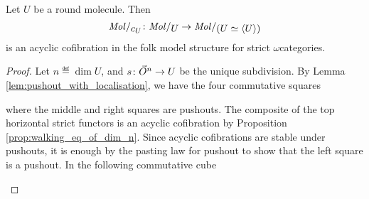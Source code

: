 \begin{prop} \label{prop:molecin_send_Jcomp_to_acof}
    Let \( U \) be a round molecule.
    Then
    \begin{equation*}
        \molecin{c_U} \colon \molecin{U} \to \molecin{(U \simeq \compos{U})}
    \end{equation*}
    is an acyclic cofibration in the folk model structure for strict \( \omega \)\nbd categories.
\end{prop}
\begin{proof}
    Let \( n \eqdef \dim U \), and \( s \colon \vec{O}^{n} \to U \) be the unique subdivision.
    By Lemma \ref{lem:pushout_with_localisation}, we have the four commutative squares
    \begin{center}
    \end{center}
    where the middle and right squares are pushouts.
    The composite of the top horizontal strict functors is an acyclic cofibration by Proposition \ref{prop:walking_eq_of_dim_n}.
    Since acyclic cofibrations are stable under pushouts, it is enough by the pasting law for pushout to show that the left square is a pushout.
    In the following commutative cube
    \begin{center}
\end{center}
\end{proof}
